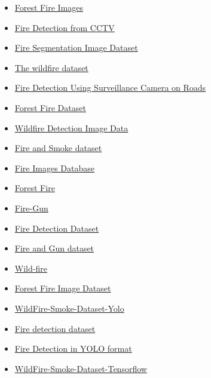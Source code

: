 \begin{itemize}
	\item \href{https://www.kaggle.com/datasets/mohnishsaiprasad/forest-fire-images}{Forest Fire Images}
	\item \href{https://www.kaggle.com/datasets/ritupande/fire-detection-from-cctv}{Fire Detection from CCTV}
	\item \href{https://www.kaggle.com/datasets/diversisai/fire-segmentation-image-dataset}{Fire Segmentation Image Dataset}
	\item \href{https://www.kaggle.com/datasets/elmadafri/the-wildfire-dataset}{The wildfire dataset}
	\item \href{https://www.kaggle.com/datasets/tharakan684/urecamain}{Fire Detection Using Surveillance Camera on Roads}
	\item \href{https://www.kaggle.com/datasets/alik05/forest-fire-dataset}{Forest Fire Dataset}
	\item \href{https://www.kaggle.com/datasets/brsdincer/wildfire-detection-image-data}{Wildfire Detection Image Data}
	\item \href{https://www.kaggle.com/datasets/ashutosh69/fire-and-smoke-dataset}{Fire and Smoke dataset}
	\item \href{https://www.kaggle.com/datasets/gondimjoaom/fire-images-database}{Fire Images Database}
	\item \href{https://www.kaggle.com/datasets/arbethi/forest-fire}{Forest Fire}
	\item \href{https://www.kaggle.com/datasets/parthmehta15/fire-gun}{Fire-Gun}
	\item \href{https://www.kaggle.com/datasets/christofel04/fire-detection-dataset}{Fire Detection Dataset}
	\item \href{https://www.kaggle.com/datasets/atulyakumar98/fire-and-gun-dataset}{Fire and Gun dataset}
	\item \href{https://www.kaggle.com/datasets/ashukr/wildfire}{Wild-fire}
	\item \href{https://www.kaggle.com/datasets/cristiancristancho/forest-fire-image-dataset}{Forest Fire Image Dataset}
	\item \href{https://www.kaggle.com/datasets/ahemateja19bec1025/wildfiresmokedatasetyolo}{WildFire-Smoke-Dataset-Yolo}
	\item \href{https://www.kaggle.com/datasets/kabilan03/fire-detection-dataset}{Fire detection dataset}
	\item \href{https://www.kaggle.com/datasets/ankan1998/fire-detection-in-yolo-format}{Fire Detection in YOLO format}
	\item \href{https://www.kaggle.com/datasets/ahemateja19bec1025/wildfiresmokedataset}{WildFire-Smoke-Dataset-Tensorflow}
\end{itemize}




